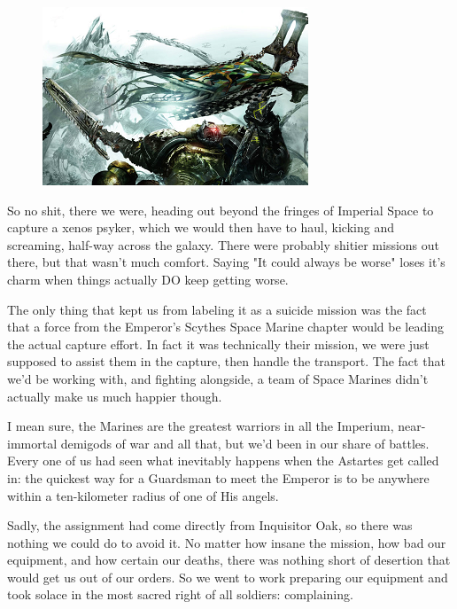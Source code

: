 \begin{figure}
	\begin{center}
		\includegraphics[width=\figwidth]{pics/12/6.png}
	\end{center}
\end{figure}
So no shit, there we were, heading out beyond the fringes of Imperial Space to capture a xenos psyker, which we would then have to haul, kicking and screaming, half-way across the galaxy. 
There were probably shitier missions out there, but that wasn't much comfort. 
Saying "It could always be worse" loses it's charm when things actually DO keep getting worse. 


The only thing that kept us from labeling it as a suicide mission was the fact that a force from the Emperor's Scythes Space Marine chapter would be leading the actual capture effort. 
In fact it was technically their mission, we were just supposed to assist them in the capture, then handle the transport. 
The fact that we'd be working with, and fighting alongside, a team of Space Marines didn't actually make us much happier though. 


I mean sure, the Marines are the greatest warriors in all the Imperium, near-immortal demigods of war and all that, but we'd been in our share of battles. 
Every one of us had seen what inevitably happens when the Astartes get called in: 
the quickest way for a Guardsman to meet the Emperor is to be anywhere within a ten-kilometer radius of one of His angels.

Sadly, the assignment had come directly from Inquisitor Oak, so there was nothing we could do to avoid it. 
No matter how insane the mission, how bad our equipment, and how certain our deaths, there was nothing short of desertion that would get us out of our orders. 
So we went to work preparing our equipment and took solace in the most sacred right of all soldiers: 
complaining.

